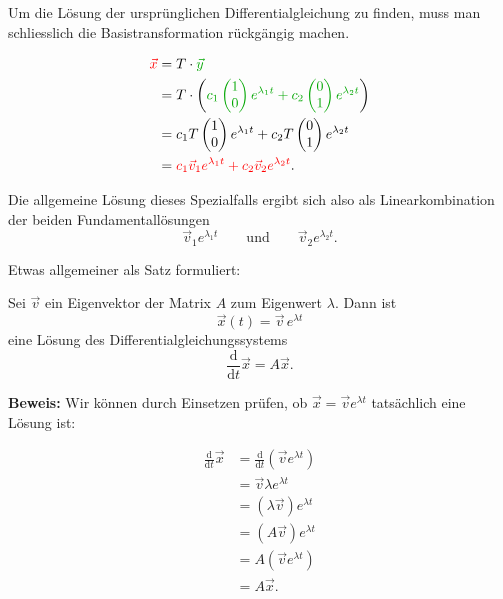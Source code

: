 Um die Lösung der ursprünglichen Differentialgleichung zu finden,
muss man schliesslich die Basistransformation rückgängig machen.

\[
    \begin{aligned}
        {\color{red}\vec{x}}
         & = T\cdot{\color{green!65!black}\vec{y}}                         \\
         & = T\cdot\left(
                   {\color{green!65!black}
                       c_1\begin{pmatrix}1\\0\end{pmatrix}e^{\lambda_1t}
                       +c_2\begin{pmatrix}0\\1\end{pmatrix}e^{\lambda_2t}}
        \right)                                                            \\
         & = c_1T\begin{pmatrix}1\\0\end{pmatrix}e^{\lambda_1t}
        +c_2T\begin{pmatrix}0\\1\end{pmatrix}e^{\lambda_2t}                \\
         & = {\color{red}
                 c_1\vec{v}_1e^{\lambda_1t}
                 +c_2\vec{v}_2e^{\lambda_2t}}.
    \end{aligned}
\]

Die allgemeine Lösung dieses Spezialfalls ergibt sich also
als Linearkombination der beiden Fundamentallösungen
\[
    \vec{v}_1e^{\lambda_1t}
    \qquad\text{und}\qquad
    \vec{v}_2e^{\lambda_2t}.
\]

Etwas allgemeiner als Satz formuliert:

\begin{satz}{}{}
    Sei \(\vec{v}\) ein Eigenvektor der Matrix \(A\) zum
    Eigenwert \(\lambda\). Dann ist
    \[
        \vec{x}(t)=\vec{v}\,e^{\lambda t}
    \]
    eine Lösung des Differentialgleichungssystems
    \[
        \frac{\mathrm{d}}{\mathrm{d}t}\vec{x}=A\vec{x}.
    \]
\end{satz}

\textbf{Beweis:}
Wir können durch Einsetzen prüfen, ob
\(\vec{x}=\vec{v}e^{\lambda t}\) tatsächlich eine Lösung ist:

\[
    \begin{aligned}
        \frac{\mathrm{d}}{\mathrm{d}t}\vec{x}
         & =\frac{\mathrm{d}}{\mathrm{d}t}
        \left(\vec{v}e^{\lambda t}\right)      \\
         & =\vec{v}\lambda e^{\lambda t}       \\
         & =(\lambda\vec{v})e^{\lambda t}      \\
         & =(A\vec{v})e^{\lambda t}            \\
         & =A\left(\vec{v}e^{\lambda t}\right) \\
         & =A\vec{x}.
    \end{aligned}
\]

